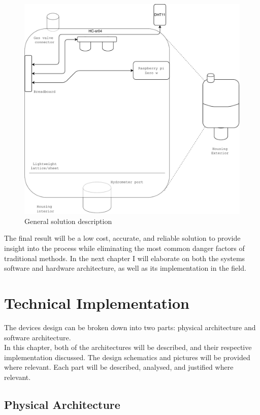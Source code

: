 \documentclass[twoside]{ctuthesis}
\theoremstyle{plain}
\theoremstyle{definition}
\theoremstyle{note}
\begin{document}
\begin{figure}[H]
	\centering
	\includegraphics[scale=0.4]{Housing}
	\caption{General solution description}
\end{figure}

The final result will be a low cost, accurate, and reliable solution to provide insight into the process while eliminating the most common danger factors of traditional methods. In the next chapter I will elaborate on both the systems software and hardware architecture, as well as its implementation in the field.


\pagebreak

\begingroup
\renewcommand{\cleardoublepage}{}
\renewcommand{\clearpage}{}
\chapter{Technical Implementation}
\endgroup

The devices design can be broken down into two parts: physical architecture and software architecture.\\
In this chapter, both of the architectures will be described, and their respective implementation discussed. The design schematics and pictures will be provided where relevant. Each part will be described, analysed, and justified where relevant.

\section{Physical Architecture}
\end{document}
